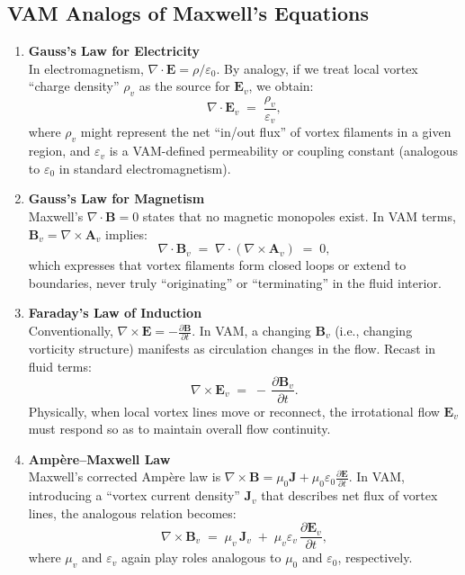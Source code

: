 \documentclass[aps,preprint,superscriptaddress]{revtex4-2}
\begin{document}
    \subsection{VAM Analogs of Maxwell’s Equations}

    \begin{enumerate}
        \item \textbf{Gauss’s Law for Electricity} \\
    In electromagnetism, \(\nabla \cdot \mathbf{E} = \rho / \varepsilon_0\). By analogy, if we treat local vortex “charge density” \(\rho_{v}\) as the source for \(\mathbf{E}_v\), we obtain:
    \[
        \nabla \cdot \mathbf{E}_v \;=\;
        \frac{\rho_{v}}{\varepsilon_v},
    \]
    where \(\rho_{v}\) might represent the net “in/out flux” of vortex filaments in a given region, and \(\varepsilon_v\) is a VAM-defined permeability or coupling constant (analogous to \(\varepsilon_0\) in standard electromagnetism).

        \item \textbf{Gauss’s Law for Magnetism} \\
    Maxwell’s \(\nabla \cdot \mathbf{B} = 0\) states that no magnetic monopoles exist. In VAM terms, \(\mathbf{B}_v = \nabla \times \mathbf{A}_v\) implies:
    \[
        \nabla \cdot \mathbf{B}_v
        \;=\;
        \nabla \cdot (\nabla \times \mathbf{A}_v)
        \;=\;
        0,
    \]
    which expresses that vortex filaments form closed loops or extend to boundaries, never truly “originating” or “terminating” in the fluid interior.

        \item \textbf{Faraday’s Law of Induction} \\
    Conventionally, \(\nabla \times \mathbf{E} = - \tfrac{\partial \mathbf{B}}{\partial t}\). In VAM, a changing \(\mathbf{B}_v\) (i.e., changing vorticity structure) manifests as circulation changes in the flow. Recast in fluid terms:
    \[
        \nabla \times \mathbf{E}_v
        \;=\;
        -\,\frac{\partial \mathbf{B}_v}{\partial t}.
    \]
    Physically, when local vortex lines move or reconnect, the irrotational flow \(\mathbf{E}_v\) must respond so as to maintain overall flow continuity.

        \item \textbf{Ampère–Maxwell Law} \\
    Maxwell’s corrected Ampère law is \(\nabla \times \mathbf{B} = \mu_0 \mathbf{J} + \mu_0 \varepsilon_0 \tfrac{\partial \mathbf{E}}{\partial t}\). In VAM, introducing a “vortex current density” \(\mathbf{J}_v\) that describes net flux of vortex lines, the analogous relation becomes:
    \[
        \nabla \times \mathbf{B}_v
        \;=\;
        \mu_v\,\mathbf{J}_v
        \;+\;
        \mu_v \varepsilon_v \,\frac{\partial \mathbf{E}_v}{\partial t},
    \]
    where \(\mu_v\) and \(\varepsilon_v\) again play roles analogous to \(\mu_0\) and \(\varepsilon_0\), respectively.
    \end{enumerate}
\end{document}

